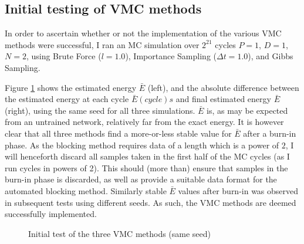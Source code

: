 \documentclass[%
oneside,                 %
final,                   %
10pt]{article}
\begin{document}
\subsection{Initial testing of VMC methods}
In order to ascertain whether or not the implementation of the various VMC methods were successful, I ran an MC simulation over $2^{21}$ cycles $P=1$, $D=1$, $N=2$, using Brute Force ($l=1.0$), Importance Sampling ($\Delta t=1.0$), and Gibbs Sampling. 

Figure \ref{fig:inital_1} shows the estimated energy $\bar E$ (left), and the absolute difference between the estimated energy at each cycle $\bar E(cycle)s$ and final estimated energy $\bar E$ (right), using the same seed for all three simulations. $\bar E$ is, as may be expected from an untrained network, relatively far from the exact energy. It is however clear that all three methods find a more-or-less stable value for $\bar E$ after a burn-in phase. As the blocking method requires data of a length which is a power of $2$, I will henceforth discard all samples taken in the first half of the MC cycles (as I run cycles in powers of 2). This should (more than) ensure that samples in the burn-in phase is discarded, as well as provide a suitable data format for the automated blocking method. Similarly stable $\bar E$ values after burn-in was observed in subsequent tests using different seeds. As such, the VMC methods are deemed successfully implemented.
	\begin{figure}
		\centering
		\caption{Initial test of the three VMC methods (same seed)}
		   \label{fig:inital_1}   
	\end{figure}
	
\end{document}
